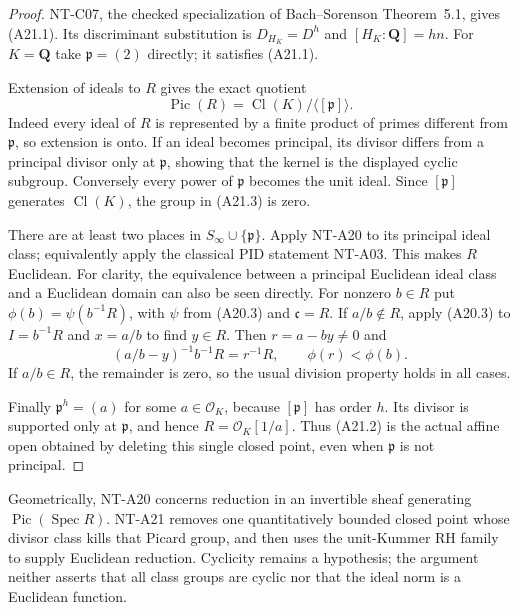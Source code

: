 \begin{proof}
NT-C07, the checked specialization of Bach--Sorenson
Theorem~5.1, gives (A21.1). Its discriminant
substitution is $D_{H_K}=D^h$ and $[H_K:\mathbf Q]=hn$.
For $K=\mathbf Q$ take $\mathfrak p=(2)$ directly;
it satisfies (A21.1).

Extension of ideals to $R$ gives the exact quotient
\[
 \operatorname{Pic}(R)=
       \operatorname{Cl}(K)/\langle[\mathfrak p]\rangle.
 \tag{A21.3}
\]
Indeed every ideal of $R$ is represented by a finite
product of primes different from $\mathfrak p$,
so extension is onto. If an ideal becomes principal,
its divisor differs from a principal divisor only at
$\mathfrak p$, showing that the kernel is the displayed
cyclic subgroup. Conversely every power of
$\mathfrak p$ becomes the unit ideal.
Since $[\mathfrak p]$ generates $\operatorname{Cl}(K)$,
the group in (A21.3) is zero.

There are at least two places in
$S_\infty\cup\{\mathfrak p\}$. Apply NT-A20 to its
principal ideal class; equivalently apply the
classical PID statement NT-A03. This makes $R$
Euclidean. For clarity, the equivalence between a
principal Euclidean ideal class and a Euclidean domain
can also be seen directly. For nonzero $b\in R$ put
$\phi(b)=\psi(b^{-1}R)$, with $\psi$ from (A20.3) and
$\mathfrak c=R$. If $a/b\notin R$, apply (A20.3) to
$I=b^{-1}R$ and $x=a/b$ to find $y\in R$. Then
$r=a-by\ne0$ and
\[
       (a/b-y)^{-1}b^{-1}R=r^{-1}R,\qquad
                                  \phi(r)<\phi(b).
 \tag{A21.4}
\]
If $a/b\in R$, the remainder is zero, so the usual
division property holds in all cases.

Finally $\mathfrak p^h=(a)$ for some $a\in\mathcal O_K$,
because $[\mathfrak p]$ has order $h$. Its divisor
is supported only at $\mathfrak p$, and hence
$R=\mathcal O_K[1/a]$. Thus (A21.2) is the actual
affine open obtained by deleting this single closed
point, even when $\mathfrak p$ is not principal.
\end{proof}

Geometrically, NT-A20 concerns reduction in an
invertible sheaf generating
$\operatorname{Pic}(\operatorname{Spec}R)$.
NT-A21 removes one quantitatively bounded closed point
whose divisor class kills that Picard group, and then
uses the unit-Kummer RH family to supply Euclidean
reduction. Cyclicity remains a hypothesis; the
argument neither asserts that all class groups are
cyclic nor that the ideal norm is a Euclidean function.
